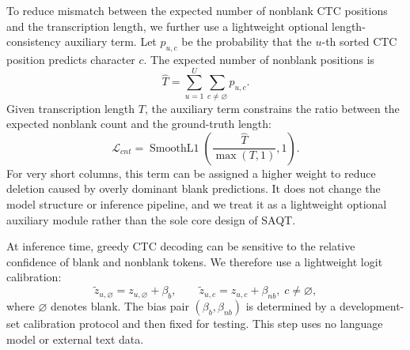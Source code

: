To reduce mismatch between the expected number of nonblank CTC positions and the transcription length, we further use a lightweight optional length-consistency auxiliary term. Let $p_{u,c}$ be the probability that the $u$-th sorted CTC position predicts character $c$. The expected number of nonblank positions is
\begin{equation}
\hat{T}=\sum_{u=1}^{U}\sum_{c\neq\varnothing}p_{u,c}.
\end{equation}
Given transcription length $T$, the auxiliary term constrains the ratio between the expected nonblank count and the ground-truth length:
\begin{equation}
\mathcal{L}_{cnt}=
\operatorname{SmoothL1}
\left(
\frac{\hat{T}}{\max(T,1)}, 1
\right).
\end{equation}
For very short columns, this term can be assigned a higher weight to reduce deletion caused by overly dominant blank predictions. It does not change the model structure or inference pipeline, and we treat it as a lightweight optional auxiliary module rather than the sole core design of SAQT.

At inference time, greedy CTC decoding can be sensitive to the relative confidence of blank and nonblank tokens. We therefore use a lightweight logit calibration:
\begin{equation}
\tilde{z}_{u,\varnothing}=z_{u,\varnothing}+\beta_b,\qquad
\tilde{z}_{u,c}=z_{u,c}+\beta_{nb},\; c\neq\varnothing,
\end{equation}
where $\varnothing$ denotes blank. The bias pair $(\beta_b,\beta_{nb})$ is determined by a development-set calibration protocol and then fixed for testing. This step uses no language model or external text data.
